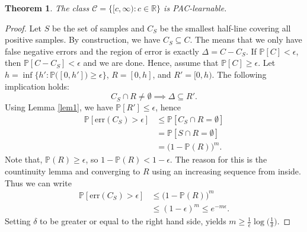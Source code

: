 \documentclass[]{article}
\newtheorem{theorem}{Theorem}
\newcommand{\R}{\mathbb{R}}
\begin{document}
\begin{theorem} 
	The class $\mathcal{C} = \big\{[c, \infty): c\in\R\big\}$ is PAC-learnable.
\end{theorem}

\begin{proof}
Let $S$ be the set of samples and $C_S$ be the smallest half-line covering all positive samples. By construction, we have $C_S \subseteq C$. The means that we only have false negative errors and the region of error is exactly $\Delta = C - C_S$. If $\mathbb{P}[C] < \epsilon$, then $\mathbb{P}[C-C_S] < \epsilon$ and we are done. Hence, assume that $\mathbb{P}[C] \geq \epsilon$. Let $h = \inf \Big\{h' : \mathbb{P}\big([0, h']\big)\geq\epsilon\Big\}$, $R = [0, h]$, and $R' = [0, h)$. The following implication holds:
$$C_S\cap R \neq \emptyset \implies \Delta \subseteq R'.$$
Using Lemma \eqref{lem1}, we have $\mathbb{P}[R']\leq \epsilon$, hence
\begin{align}
\mathbb{P}[\mathrm{err}(C_S)>\epsilon]&\leq \mathbb{P}[C_S\cap R = \emptyset]\\
&=\mathbb{P}[S\cap R = \emptyset]\\
&= \big(1-\mathbb{P}(R)\big)^m.
\end{align}
Note that, $\mathbb{P}(R)\geq \epsilon$, so $1 - \mathbb{P}(R) < 1- \epsilon$. The reason for this is the countinuity lemma and converging to $R$ using an increasing sequence from inside. Thus we can write
\begin{align}
\mathbb{P}[\mathrm{err}(C_S)>\epsilon]&\leq \big(1-\mathbb{P}(R)\big)^m\\
&\leq (1-\epsilon)^m \leq e^{-m\epsilon}.
\end{align}
Setting $\delta$ to be greater or equal to the right hand side, yields $m \geq \frac{1}{\epsilon}\log\Big(\frac{1}{\delta}\Big)$.
\end{proof}



\end{document}
